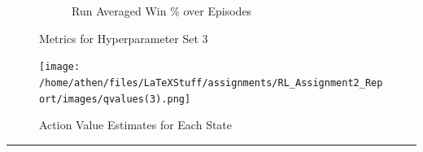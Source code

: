 \documentclass[a4paper,9pt]{scrartcl}
\begin{document}
\begin{figure}[H]
\begin{subfigure}[b]{0.32\textwidth}
\caption{Run Averaged Win \% over Episodes}
\label{fig:win_percent_avg}
\end{subfigure}
\caption{Metrics for Hyperparameter Set 3}
\label{fig:training_metrics}
\end{figure}

\begin{figure}[h]
\centering
\texttt{[image: /home/athen/files/LaTeXStuff/assignments/RL\_Assignment2\_Report/images/qvalues(3).png]}
\caption{Action Value Estimates for Each State}
\label{fig:style_transfer_example}
\end{figure}


\rule{\linewidth}{0.2mm}
% 
% 
\end{document}
